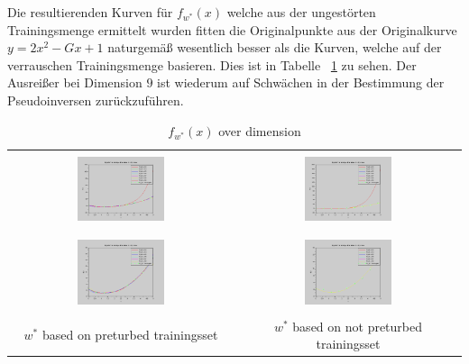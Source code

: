 \documentclass[]{report}
\begin{document}
Die resultierenden Kurven f\"ur $f_{w^*}(x)$ welche aus der ungest\"orten Trainingsmenge ermittelt wurden fitten die Originalpunkte aus der Originalkurve $y = 2x^2-Gx+1$ naturgem\"a{\ss} wesentlich besser als die Kurven, welche auf der verrauschen Trainingsmenge basieren. Dies ist in Tabelle ~\ref{tab:f_x_overDimension} zu sehen. Der Ausrei{\ss}er bei Dimension $9$ ist wiederum auf Schw\"achen in der Bestimmung der Pseudoinversen zur\"uckzuf\"uhren.

\begin{table}[h]
\begin{tabular}{| c | c |}
\hline
 & \\
\includegraphics[width=0.4\textwidth]{./images/f_x_w_star_overDimensions.png} & \includegraphics[width=0.4\textwidth]{./images/f_x_w_star_not_preturbed_overDimensions.png} \\
 & \\
 \hline
 & \\
\includegraphics[width=0.4\textwidth]{./images/f_x_w_star_overDimensions_stable.png} & \includegraphics[width=0.4\textwidth]{./images/f_x_w_star_not_preturbed_overDimensions_stable.png} \\
 & \\ 
$w^*$ based on preturbed trainingsset & $w^*$ based on not preturbed trainingsset \\
\hline
\end{tabular}
\caption{$f_{w^*}(x)$ over dimension}
\label{tab:f_x_overDimension}
\end{table}
\end{document}
